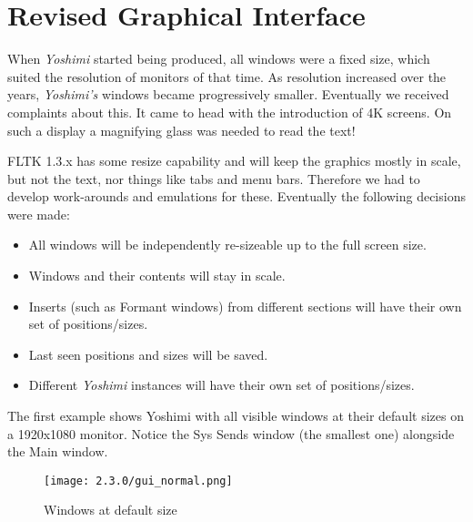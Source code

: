 %
%
%

\section{Revised Graphical Interface}
\label{sec:revised_interface}
   When \textsl{Yoshimi} started being produced, all windows were
   a fixed size, which suited the resolution of monitors of that time.
   As resolution increased over the years,
   \textsl{Yoshimi's} windows became progressively smaller.
   Eventually we received complaints about this.
   It came to head with the introduction of 4K
   screens. On such a display a magnifying glass was needed to read the text!

   FLTK 1.3.x has some resize capability and will keep the graphics mostly in
   scale, but not the text, nor things like tabs and menu bars. Therefore we had
   to develop work-arounds and emulations for these. Eventually the following
   decisions were made:

   \begin{itemize}
      \item All windows will be independently re-sizeable up to the full
         screen size.
      \item Windows and their contents will stay in scale.
      \item Inserts (such as Formant windows) from different sections will have
         their own set of positions/sizes.
      \item Last seen positions and sizes will be saved.
      \item Different \textsl{Yoshimi} instances will have their own set of
         positions/sizes.
   \end{itemize}

\pagebreak
   The first example shows Yoshimi with all visible windows at their default sizes
   on a 1920x1080 monitor. Notice the Sys Sends window (the smallest one)
   alongside the Main window.

   \begin{figure}[H]
      \centering
      \texttt{[image: 2.3.0/gui\_normal.png]}
      \caption{Windows at default size}
      \label{fig:default_size_windows}
   \end{figure}

